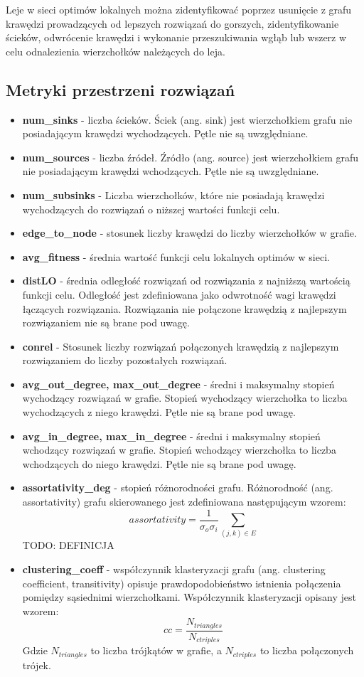 Leje w sieci optimów lokalnych można zidentyfikować poprzez usunięcie z grafu krawędzi prowadzących od lepszych rozwiązań do gorszych,
zidentyfikowanie ścieków, odwrócenie krawędzi i wykonanie przeszukiwania wgłąb lub wszerz w celu odnalezienia wierzchołków należących do leja.
\subsection{Metryki przestrzeni rozwiązań}

\begin{itemize}
      \item \textbf{num\_sinks} - liczba ścieków. Ściek (ang. sink) jest wierzchołkiem grafu nie posiadającym krawędzi wychodzących.
            Pętle nie są uwzględniane.
      \item \textbf{num\_sources} - liczba źródeł. Źródło (ang. source) jest wierzchołkiem grafu nie posiadającym krawędzi wchodzących.
            Pętle nie są uwzględniane.
      \item \textbf{num\_subsinks} - Liczba wierzchołków, które nie posiadają krawędzi wychodzących do rozwiązań o niższej wartości funkcji celu.
      \item \textbf{edge\_to\_node} - stosunek liczby krawędzi do liczby wierzchołków w grafie.
      \item \textbf{avg\_fitness} - średnia wartość funkcji celu lokalnych optimów w sieci.
      \item \textbf{distLO} - średnia odległość rozwiązań od rozwiązania z najniższą wartością funkcji celu. Odległość jest zdefiniowana jako odwrotność wagi krawędzi łączących rozwiązania.
            Rozwiązania nie połączone krawędzią z najlepszym rozwiązaniem nie są brane pod uwagę.
      \item \textbf{conrel} - Stosunek liczby rozwiązań połączonych krawędzią z najlepszym rozwiązaniem do liczby pozostałych rozwiązań.
      \item \textbf{avg\_out\_degree, max\_out\_degree} - średni i maksymalny stopień wychodzący rozwiązań w grafie. Stopień wychodzący wierzchołka to liczba wychodzących z niego krawędzi. Pętle nie są brane pod uwagę.
      \item \textbf{avg\_in\_degree, max\_in\_degree} - średni i maksymalny stopień wchodzący rozwiązań w grafie. Stopień wchodzący wierzchołka to liczba wchodzących do niego krawędzi. Pętle nie są brane pod uwagę.
      \item \textbf{assortativity\_deg} - stopień różnorodności grafu.  Różnorodność (ang. assortativity) grafu skierowanego jest zdefiniowana następującym wzorem:
            $$ assortativity = \frac{1}{\sigma_o \sigma_i} \sum_{(j,k)\in{E}} $$
            TODO: DEFINICJA
      \item \textbf{clustering\_coeff} - współczynnik klasteryzacji grafu (ang. clustering coefficient, transitivity) opisuje prawdopodobieństwo istnienia połączenia pomiędzy sąsiednimi wierzchołkami.
            Współczynnik klasteryzacji opisany jest wzorem:
            $$cc = \frac{N_{triangles}}{N_{ctriples}}$$
            Gdzie $N_{triangles}$ to liczba trójkątów w grafie, a $N_{ctriples}$ to liczba połączonych trójek.


\end{itemize}
